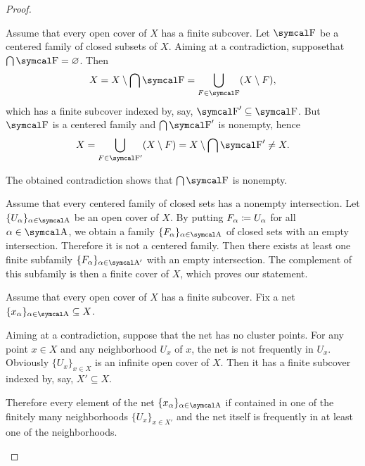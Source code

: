 \begin{proof}\mbox{}
  \begin{description}
     Assume that every open cover of \( X \) has a finite subcover. Let \( \CF \) be a centered family of closed subsets of \( X \). Aiming at a contradiction, suppose\LEM that \( \bigcap \CF = \varnothing \). Then
    \begin{equation*}
      X
      =
      X \setminus \bigcap \CF
      =
      \bigcup_{F \in \CF} (X \setminus F),
    \end{equation*}
    which has a finite subcover indexed by, say, \( \CF' \subseteq \CF \). But \( \CF \) is a centered family and \( \bigcap \CF' \) is nonempty, hence
    \begin{equation*}
      X
      =
      \bigcup_{F \in \CF'} (X \setminus F)
      =
      X \setminus \bigcap \CF'
      \neq
      X.
    \end{equation*}

    The obtained contradiction shows that \( \bigcap \CF \) is nonempty.

     Assume that every centered family of closed sets has a nonempty intersection. Let \( \{ U_\al \}_{\al \in \CA} \) be an open cover of \( X \). By putting \( F_\alpha \coloneqq U_\alpha \) for all \( \al \in \CA \), we obtain a family \( \{ F_\al \}_{\al \in \CA} \) of closed sets with an empty intersection. Therefore it is not a centered family. Then there exists at least one finite subfamily \( \{ F_\al \}_{\al \in \CA'} \) with an empty intersection. The complement of this subfamily is then a finite cover of \( X \), which proves our statement.

     Assume that every open cover of \( X \) has a finite subcover. Fix a net \( \{ x_\al \}_{\al \in \CA} \subseteq X \).

    Aiming at a contradiction, suppose that the net has no cluster points. For any point \( x \in X \) and any neighborhood \( U_x \) of \( x \), the net is not frequently in \( U_x \). Obviously \( \{ U_x \}_{x \in X} \) is an infinite open cover of \( X \). Then it has a finite subcover indexed by, say, \( X' \subseteq X \).

    Therefore every element of the net \( \{ x_\al \}_{\al \in \CA} \) if contained in one of the finitely many neighborhoods \( \{ U_x \}_{x \in X'} \) and the net itself is frequently in at least one of the neighborhoods.


\end{description}
\end{proof}
